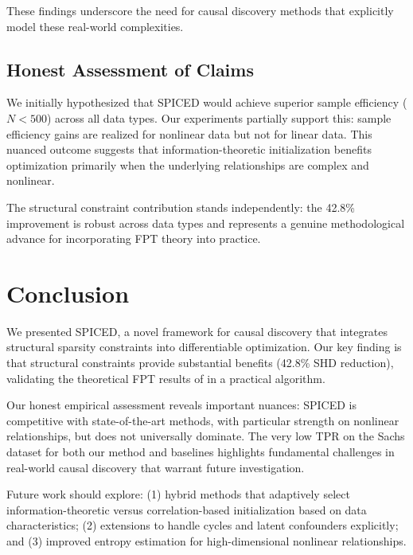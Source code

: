 \documentclass{article}
\begin{document}
These findings underscore the need for causal discovery methods that explicitly model these real-world complexities.

\subsection{Honest Assessment of Claims}

We initially hypothesized that SPICED would achieve superior sample efficiency ($N < 500$) across all data types. Our experiments partially support this: sample efficiency gains are realized for nonlinear data but not for linear data. This nuanced outcome suggests that information-theoretic initialization benefits optimization primarily when the underlying relationships are complex and nonlinear.

The structural constraint contribution stands independently: the 42.8\% improvement is robust across data types and represents a genuine methodological advance for incorporating FPT theory into practice.

\section{Conclusion}

We presented SPICED, a novel framework for causal discovery that integrates structural sparsity constraints into differentiable optimization. Our key finding is that structural constraints provide substantial benefits (42.8\% SHD reduction), validating the theoretical FPT results of \citet{ganian2024revisiting} in a practical algorithm.

Our honest empirical assessment reveals important nuances: SPICED is competitive with state-of-the-art methods, with particular strength on nonlinear relationships, but does not universally dominate. The very low TPR on the Sachs dataset for both our method and baselines highlights fundamental challenges in real-world causal discovery that warrant future investigation.

Future work should explore: (1) hybrid methods that adaptively select information-theoretic versus correlation-based initialization based on data characteristics; (2) extensions to handle cycles and latent confounders explicitly; and (3) improved entropy estimation for high-dimensional nonlinear relationships.
\end{document}
